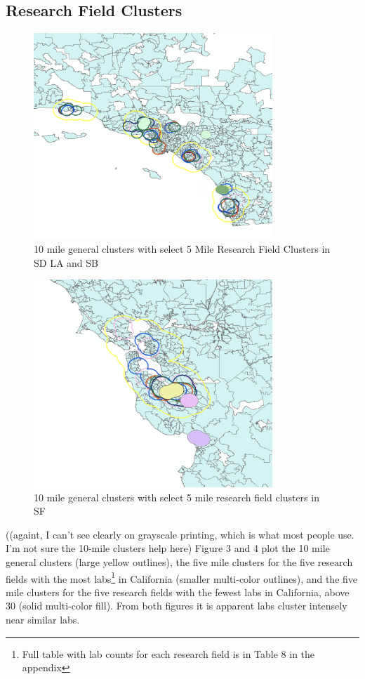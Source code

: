 \documentclass[12pt,letterpaper]{article}
\begin{document}
\subsection{Research Field Clusters}
\begin{figure}[H]
    \centering
    \includegraphics[width=9cm]{RLA.png}
    \caption{10 mile general clusters with select 5 Mile Research Field Clusters in SD LA and SB}
    \label{fig:lab3}
\end{figure}
\begin{figure}[H]
    \centering
    \includegraphics[width=9cm]{RSF.png}
    \caption{10 mile general clusters with select 5 mile research field clusters in SF}
    \label{fig:lab4}
\end{figure}
\par 
({\color{red}(againt, I can't see clearly on grayscale printing, which is what most people use. I'm not sure the 10-mile clusters help here)}
Figure 3 and 4 plot the 10 mile general clusters (large yellow outlines), the five mile clusters for the five research fields with the most labs\footnote{Full table with lab counts for each research field is in Table 8 in the appendix} in California (smaller multi-color outlines), and the five mile clusters for the five research fields with the fewest labs in California, above 30 (solid multi-color fill). From both figures it is apparent labs cluster intensely near similar labs.
\end{document}
